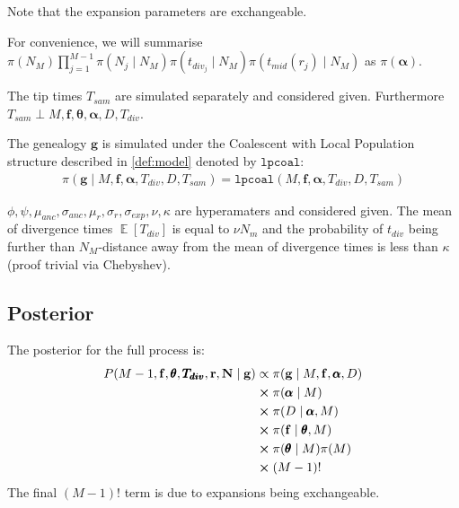 \documentclass{report}
\theoremstyle{definition}
\begin{document}
Note that the expansion parameters are exchangeable.

For convenience, we will summarise $\pi(N_M)\prod\limits_{j=1}^{M-1}\pi(N_j\mid N_{M})\pi(t_{div_j}\mid N_{M})\pi(t_{mid}(r_j)\mid N_M)$ as $\pi(\pmb\alpha)$.

The tip times $T_{sam}$ are simulated separately and considered given. Furthermore $T_{sam} \perp M, \mathbf{f}, \pmb{\theta}, \pmb\alpha, D, T_{div}$.

The genealogy $\mathbf{g}$ is simulated under the Coalescent with Local Population structure described in \ref{def:model} denoted by $\texttt{lpcoal}$:
\begin{gather}
\pi(\mathbf{g}\mid M, \mathbf{f}, \pmb\alpha, T_{div}, D, T_{sam}) = \texttt{lpcoal}(M, \mathbf{f}, \pmb\alpha, T_{div}, D, T_{sam})
\end{gather} 

$\phi, \psi, \mu_{anc}, \sigma_{anc}, \mu_r, \sigma_r, \sigma_{exp}, \nu, \kappa$ are hyperamaters and considered given. The mean of divergence times $\mathop{\mathbb{E}}[T_{div}]$ is equal to $\nu N_m$ and the probability of $t_{div}$ being further than $N_M$-distance away from the mean of divergence times is less than $\kappa$ (proof trivial via Chebyshev).


\subsection{Posterior}
The posterior for the full process is:
\begin{gather}
\begin{aligned}
P(M-1, \mathbf{f}, \pmb{\theta}, \pmb{T_{div}}, \mathbf{r}, \mathbf{N}\mid\mathbf{g})
&\propto \pi(\mathbf{g}\mid M, \mathbf{f}, \pmb\alpha, D)\\
&\cross \pi(\pmb\alpha\mid M)\\
&\cross \pi(D\mid \pmb\alpha,M)\\
&\cross \pi(\mathbf{f}\mid\pmb{\theta}, M)\\
&\cross\pi(\pmb{\theta}\mid M)\pi(M)\\
&\cross (M-1)!
\end{aligned}
\end{gather}
The final $(M-1)!$ term is due to expansions being exchangeable.
\end{document}
